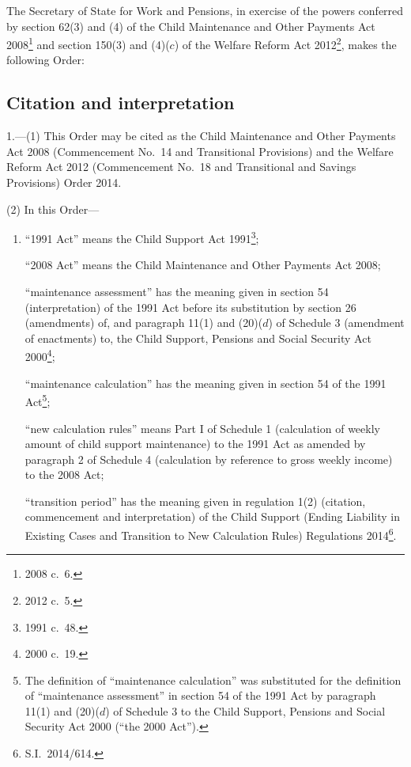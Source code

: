 \documentclass[12pt,a4paper]{article}
\title{\regstitle}
\author{S.I.\ 2014 No.\ 1635 (C.~65)}
\date{Made
24th June 2014
}
\begin{document}
\maketitle


\noindent
The Secretary of State for Work and Pensions, in exercise of the powers conferred by section 62(3) and (4) of the Child Maintenance and Other Payments Act 2008\footnote{2008 c.~6.} and section 150(3) and (4)($c$)  of the Welfare Reform Act 2012\footnote{2012 c.~5.}, makes the following Order: 

{\sloppy

\tableofcontents

}

\bigskip

\setcounter{secnumdepth}{-2}

\subsection[1. Citation and interpretation]{Citation and interpretation}

1.—(1) This Order may be cited as the Child Maintenance and Other Payments Act 2008 (Commencement No.~14 and Transitional Provisions) and the Welfare Reform Act 2012 (Commencement No.~18 and Transitional and Savings Provisions) Order 2014.

(2) In this Order—
\begin{enumerate}\item[]
“1991 Act” means the Child Support Act 1991\footnote{1991 c.~48.};

“2008 Act” means the Child Maintenance and Other Payments Act 2008;

“maintenance assessment” has the meaning given in section 54 (interpretation) of the 1991 Act before its substitution by section 26 (amendments) of, and paragraph 11(1) and (20)($d$)  of Schedule 3 (amendment of enactments) to, the Child Support, Pensions and Social Security Act 2000\footnote{2000 c.~19.};

“maintenance calculation” has the meaning given in section 54 of the 1991 Act\footnote{The definition of “maintenance calculation” was substituted for the definition of “maintenance assessment” in section 54 of the 1991 Act by paragraph 11(1) and (20)($d$)  of Schedule 3 to the Child Support, Pensions and Social Security Act 2000 (“the 2000 Act”).};

“new calculation rules” means Part I of Schedule 1 (calculation of weekly amount of child support maintenance) to the 1991 Act as amended by paragraph 2 of Schedule 4 (calculation by reference to gross weekly income) to the 2008 Act;

“transition period” has the meaning given in regulation 1(2) (citation, commencement and interpretation) of the Child Support (Ending Liability in Existing Cases and Transition to New Calculation Rules) Regulations 2014\footnote{S.I.~2014/614.}.
\end{enumerate}
\end{document}

